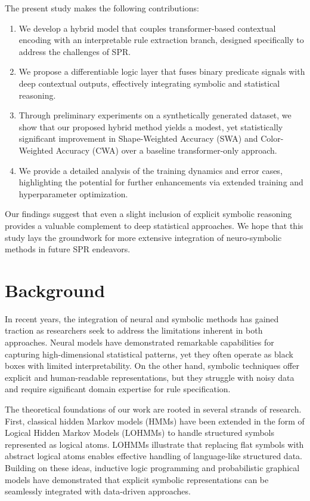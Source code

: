 \documentclass{article}
\begin{document}
The present study makes the following contributions:
\begin{enumerate}
    \item We develop a hybrid model that couples transformer-based contextual encoding with an interpretable rule extraction branch, designed specifically to address the challenges of SPR.
    \item We propose a differentiable logic layer that fuses binary predicate signals with deep contextual outputs, effectively integrating symbolic and statistical reasoning.
    \item Through preliminary experiments on a synthetically generated dataset, we show that our proposed hybrid method yields a modest, yet statistically significant improvement in Shape-Weighted Accuracy (SWA) and Color-Weighted Accuracy (CWA) over a baseline transformer-only approach.
    \item We provide a detailed analysis of the training dynamics and error cases, highlighting the potential for further enhancements via extended training and hyperparameter optimization.
\end{enumerate}

Our findings suggest that even a slight inclusion of explicit symbolic reasoning provides a valuable complement to deep statistical approaches. We hope that this study lays the groundwork for more extensive integration of neuro-symbolic methods in future SPR endeavors.

\section{Background}
In recent years, the integration of neural and symbolic methods has gained traction as researchers seek to address the limitations inherent in both approaches. Neural models have demonstrated remarkable capabilities for capturing high-dimensional statistical patterns, yet they often operate as black boxes with limited interpretability. On the other hand, symbolic techniques offer explicit and human-readable representations, but they struggle with noisy data and require significant domain expertise for rule specification.

The theoretical foundations of our work are rooted in several strands of research. First, classical hidden Markov models (HMMs) have been extended in the form of Logical Hidden Markov Models (LOHMMs) to handle structured symbols represented as logical atoms. LOHMMs illustrate that replacing flat symbols with abstract logical atoms enables effective handling of language-like structured data. Building on these ideas, inductive logic programming and probabilistic graphical models have demonstrated that explicit symbolic representations can be seamlessly integrated with data-driven approaches.
\end{document}
